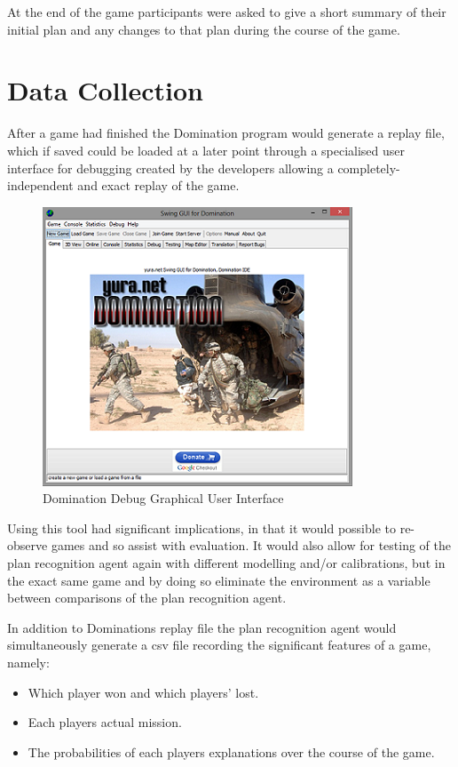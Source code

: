 \documentclass[parskip]{cs4rep}
\begin{document}
At the end of the game participants were asked to give a short summary of their initial plan and any changes to that plan during the course of the game.

\newpage

\section{Data Collection}

After a game had finished the Domination program would generate a replay file, which if saved could be loaded at a later point through a specialised user interface for debugging created by the developers allowing a completely-independent and exact replay of the game.

\begin{figure}[h]
\centerline{
\includegraphics{images/domination-debug-gui.png}
}
\caption{Domination Debug Graphical User Interface}
\label{fig:dom-debug-gui}
\end{figure} 

Using this tool had significant implications, in that it would possible to re-observe games and so assist with evaluation. It would also allow for testing of the plan recognition agent again with different modelling and/or calibrations, but in the exact same game and by doing so eliminate the environment as a variable between comparisons of the plan recognition agent.

In addition to Dominations replay file the plan recognition agent would simultaneously generate a csv file recording the significant features of a game, namely:

\begin{itemize}
\item
Which player won and which players' lost.
\item
Each players actual mission.
\item
The probabilities of each players explanations over the course of the game.
\end{itemize}
\end{document}
